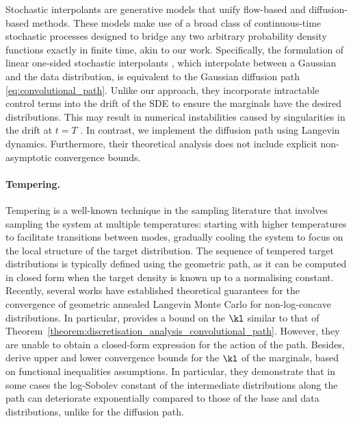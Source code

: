 Stochastic interpolants \citep{albergo2023stochastic} are generative models that unify flow-based and diffusion-based methods. These models make use of a broad class of continuous-time stochastic processes designed to bridge any two arbitrary probability density functions exactly in finite time, akin to our work. 
Specifically, the formulation of linear one-sided stochastic interpolants \citep{albergo2023stochastic, gao2024gaussian}, which interpolate between a Gaussian and the data distribution, is equivalent to the Gaussian diffusion path \eqref{eq:convolutional_path}. 
Unlike our approach, they incorporate intractable control terms into the drift of the \gls*{SDE} to ensure the marginals have the desired distributions. This may result in  numerical instabilities caused by singularities in the drift at $t= T$ \citep[Section 6]{albergo2023stochastic}. In contrast, we implement the diffusion path using Langevin dynamics. Furthermore, their theoretical analysis does not include explicit non-asymptotic convergence bounds.

\paragraph{Tempering.}
Tempering \citep{PhysRevLett.57.2607, geyer_mcmc_92, Marinari_1992} is a well-known technique in the sampling literature that involves sampling the system at multiple temperatures: starting with higher temperatures to facilitate transitions between modes, gradually cooling the system to focus on the local structure of the target distribution. 
The sequence of tempered target distributions is typically defined using the geometric path, as it can be computed in closed form when the target density is known up to a normalising constant.
Recently, several works have established theoretical guarantees for the convergence of geometric annealed Langevin Monte Carlo for non-log-concave distributions. In particular, \citet{guo2024provablebenefitannealedlangevin} provides a bound on the $\kl$  similar to that of Theorem~\ref{theorem:discretisation_analysis_convolutional_path}. However, they are unable to obtain a closed-form expression for the action of the path. 
Besides, \citet{chehab2024provableconvergencelimitationsgeometric} derive upper and lower convergence bounds for the $\kl$ of the marginals, based on functional inequalities assumptions. 
In particular, they demonstrate that in some cases the log-Sobolev constant of the intermediate distributions along the path can deteriorate exponentially compared to those of the base and data distributions, unlike for the diffusion path.